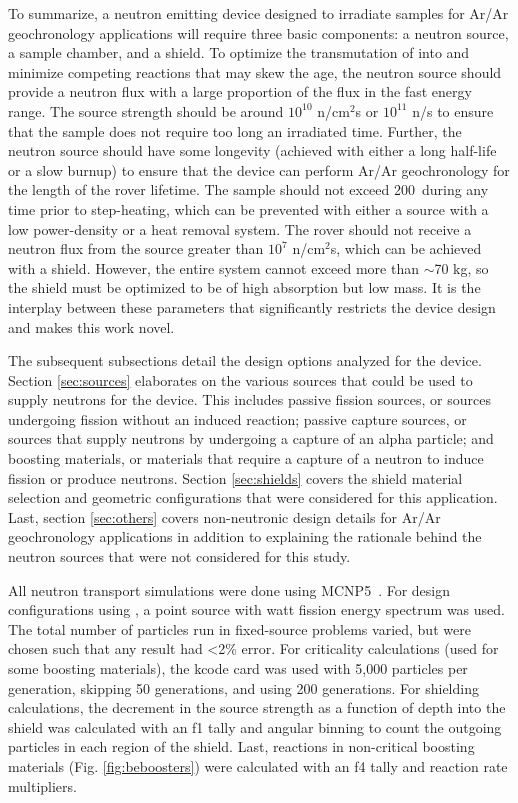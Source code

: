 \documentclass{mc2015}
\begin{document}
To summarize, a neutron emitting device designed to irradiate samples for Ar/Ar geochronology applications will require three basic components: a neutron source, a sample chamber, and a shield. To optimize the transmutation of  into  and minimize competing reactions that may skew the age, the neutron source should provide a neutron flux with a large proportion of the flux in the fast energy range. The source strength should be around $10^{10}$ n/cm$^2$s or $10^{11}$ n/s to ensure that the sample does not require too long an irradiated time. Further, the neutron source should have some longevity (achieved with either a long half-life or a slow burnup) to ensure that the device can perform Ar/Ar geochronology for the length of the rover lifetime. The sample should not exceed 200\celsius\ during any time prior to step-heating, which can be prevented with either a source with a low power-density or a heat removal system. The rover should not receive a neutron flux from the source greater than $10^7$ n/cm$^2$s, which can be achieved with a shield. However, the entire system cannot exceed more than $\sim$70 kg, so the shield must be optimized to be of high absorption but low mass. It is the interplay between these parameters that significantly restricts the device design and makes this work novel. 

The subsequent subsections detail the design options analyzed for the device. Section \ref{sec:sources} elaborates on the various sources that could be used to supply neutrons for the device. This includes passive fission sources, or sources undergoing fission without an induced reaction; passive capture sources, or sources that supply neutrons by undergoing a capture of an alpha particle; and boosting materials, or materials that require a capture of a neutron to induce fission or produce neutrons. Section \ref{sec:shields} covers the shield material selection and geometric configurations that were considered for this application. Last, section \ref{sec:others} covers non-neutronic design details for Ar/Ar geochronology applications in addition to explaining the rationale behind the neutron sources that were not considered for this study. 

All neutron transport simulations were done using MCNP5~\cite{brown_mcnp_2002}. For design configurations using , a point source with watt fission energy spectrum was used. The total number of particles run in fixed-source problems varied, but were chosen such that any result had <2\% error. For criticality calculations (used for some boosting materials), the kcode card was used with 5,000 particles per generation, skipping 50 generations, and using 200 generations. For shielding calculations, the decrement in the source strength as a function  of depth into the shield was calculated with an f1 tally and angular binning to count the outgoing particles in each region of the shield.
 Last, reactions in non-critical boosting materials (Fig. \ref{fig:beboosters}) were calculated with an f4 tally and reaction rate multipliers.
\end{document}
